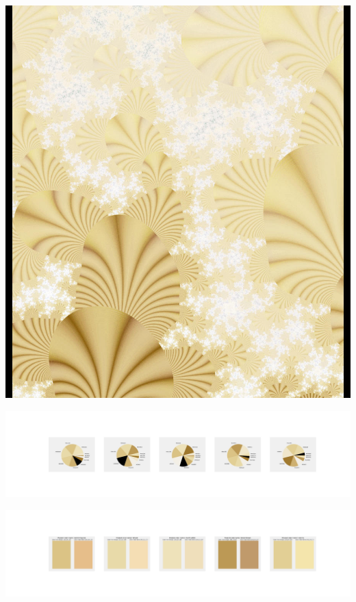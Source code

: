 \documentclass[11pt]{article}
\begin{document}
\begin{landscape}
    \begin{center}
    \includegraphics[width=\textwidth]{./nbimg/file (137).jpg}
    \end{center}

    \begin{center}
    \includegraphics[width=250mm]{./nbimg/pie-42.jpg}
    \end{center}

    \begin{center}
    \includegraphics[width=250mm]{./nbimg/peak-42.jpg}
    \end{center}
    


\end{landscape}
\end{document}
